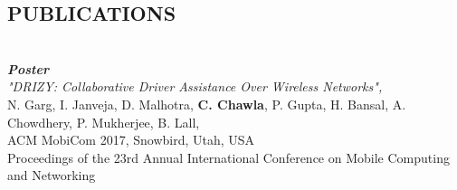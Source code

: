 \documentclass[11pt]{res} %
\newcommand{\titlegap}{5pt} %
\newcommand{\sectgap}{0.05in} %
\begin{document}
\begin{resume}
\vspace{\sectgap} 
\hline













\section{PUBLICATIONS}
\vspace{\titlegap}
\\
\textbf{\textit{Poster}}\\ \textit{"DRIZY: Collaborative Driver Assistance Over Wireless Networks",}
\\N. Garg, I. Janveja, D. Malhotra, \textbf{C. Chawla}, P. Gupta, H. Bansal, A. Chowdhery, P. Mukherjee, B. Lall, \\
ACM MobiCom 2017, Snowbird, Utah, USA
\\Proceedings of the 23rd Annual International Conference on Mobile Computing and Networking


\end{resume}
\end{document}
